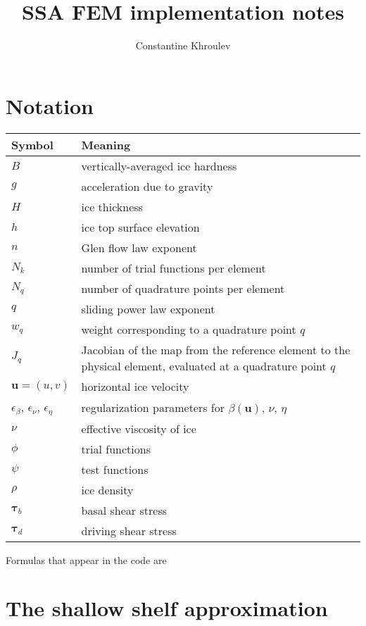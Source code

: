 \documentclass{amsart}
\newcommand{\U}{\mathbf{u}}
\newcommand{\T}{\boldsymbol{\tau}}
\newcommand{\betaU}{\beta(\U)}
\newcommand{\basalshearstress}[1]{\T_{b#1}}
\newcommand{\taub}{\basalshearstress{}}
\newcommand{\drivingstress}[1]{\T_{d#1}}
\newcommand{\taud}{\drivingstress{}}
\newcommand{\highlight}[1]{{\color{red!80!black} \fbox{$ \displaystyle #1 $} }}
\begin{document}
\title{SSA FEM implementation notes}
\author{Constantine Khroulev}
\maketitle
\tableofcontents


\section{Notation}
\label{sec-1}

\begin{center}
\begin{tabular}{lp{}}
Symbol & Meaning\\
\hline
$B$ & vertically-averaged ice hardness\\
$g$ & acceleration due to gravity\\
$H$ & ice thickness\\
$h$ & ice top surface elevation\\
$n$ & Glen flow law exponent\\
$N_k$ & number of trial functions per element\\
$N_q$ & number of quadrature points per element\\
$q$ & sliding power law exponent\\
$w_q$ & weight corresponding to a quadrature point $q$\\
$J_q$ & Jacobian of the map from the reference element to the physical element, evaluated at a quadrature point $q$\\
$\U = (u,v)$ & horizontal ice velocity\\
$\epsilon_{\beta}$, $\epsilon_{\nu}$, $\epsilon_{\eta}$ & regularization parameters for $\betaU$, $\nu$, $\eta$\\
$\nu$ & effective viscosity of ice\\
$\phi$ & trial functions\\
$\psi$ & test functions\\
$\rho$ & ice density\\
$\taub$ & basal shear stress\\
$\taud$ & driving shear stress\\
\end{tabular}
\end{center}

Formulas that appear in the code are \highlight{highlighted.}

\section{The shallow shelf approximation}
\label{sec:ssa-strong}
\end{document}
